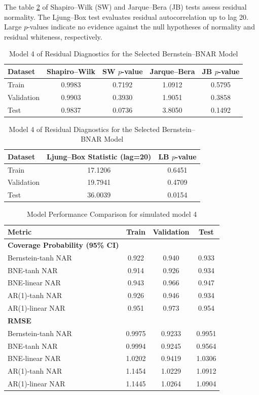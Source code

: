 \documentclass{article}
\begin{document}
The table \ref{tab:model4-residual_diagnostics} of Shapiro--Wilk (SW) and Jarque--Bera (JB) tests assess residual normality. The Ljung--Box test evaluates residual autocorrelation up to lag 20. Large $p$-values indicate no evidence against the null hypotheses of normality and residual whiteness, respectively.
\begin{table}[htbp]
\centering
\caption{Model 4 of Residual Diagnostics for the Selected Bernstein--BNAR Model}
\label{tab:model4-residual_diagnostics}
\begin{tabular}{lcccc}
\hline
\textbf{Dataset} 
& \textbf{Shapiro--Wilk} 
& \textbf{SW $p$-value} 
& \textbf{Jarque--Bera} 
& \textbf{JB $p$-value} \\
\hline
Train       & 0.9983 & 0.7192 & 1.0912 & 0.5795 \\
Validation  & 0.9903 & 0.3930 & 1.9051 & 0.3858 \\
Test        & 0.9837 & 0.0736 & 3.8050 & 0.1492 \\
\hline
\end{tabular}

\vspace{0.6em}

\begin{tabular}{lcc}
\hline
\textbf{Dataset} 
& \textbf{Ljung--Box Statistic (lag=20)} 
& \textbf{LB $p$-value} \\
\hline
Train       & 17.1206 & 0.6451 \\
Validation  & 19.7941 & 0.4709 \\
Test        & 36.0039 & 0.0154 \\
\hline
\end{tabular}

\vspace{0.6em}
\end{table}


\begin{table}[htbp]
\centering
\caption{Model Performance Comparison for simulated model 4}
\label{tab:model4_ber}
\begin{tabular}{lccc}
\toprule
\textbf{Metric} & \textbf{Train} & \textbf{Validation} & \textbf{Test} \\
\midrule
\textbf{Coverage Probability (95\% CI)} & & & \\
Bernstein-tanh NAR & 0.922 & 0.940 & 0.933 \\
BNE-tanh NAR & 0.914 & 0.926 & 0.934 \\
BNE-linear NAR & 0.943 & 0.966 & 0.947 \\
AR(1)-tanh NAR & 0.926 & 0.946 & 0.934 \\
AR(1)-linear NAR & 0.951 & 0.973 & 0.954 \\
\midrule
\textbf{RMSE} & & & \\
Bernstein-tanh NAR & 0.9975 & 0.9233 & 0.9951 \\
BNE-tanh NAR & 0.9994 & 0.9245 & 0.9564 \\
BNE-linear NAR & 1.0202 & 0.9419 & 1.0306 \\
AR(1)-tanh NAR & 1.1454 & 1.0229 & 1.0912 \\
AR(1)-linear NAR & 1.1445 & 1.0264 & 1.0904 \\
\bottomrule
\end{tabular}
\end{table}
\end{document}

